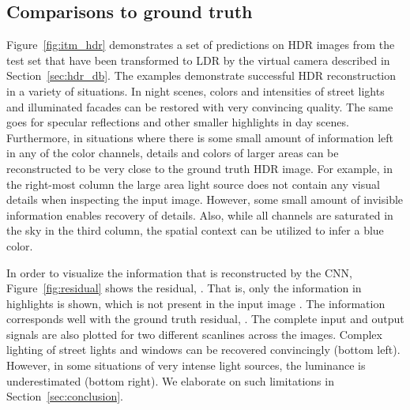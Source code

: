 \documentclass[acmtog]{acmart}
\newcommand{\figref}[1]{Figure~\ref{fig:#1}}
\newcommand{\secref}[1]{Section~\ref{sec:#1}}
\newcommand\customsection[1]{\subsection{#1}}
\begin{document}
\customsection{Comparisons to ground truth}
\figref{itm_hdr} demonstrates a set of predictions on HDR images from the test set that have been transformed to LDR by the virtual camera described in \secref{hdr_db}. The examples demonstrate successful HDR reconstruction in a variety of situations.
In night scenes, colors and intensities of street lights and illuminated facades can be restored with very convincing quality. The same goes for specular reflections and other smaller highlights in day scenes. Furthermore, in situations where there is some small amount of information left in any of the color channels, details and colors of larger areas can be reconstructed to be very close to the ground truth HDR image. For example, in the right-most column the large area light source does not contain any visual details when inspecting the input image. However, some small amount of invisible information enables recovery of details. Also, while all channels are saturated in the sky in the third column, the spatial context can be utilized to infer a blue color.

In order to visualize the information that is reconstructed by the CNN, \figref{residual} shows the residual, . That is, only the information in highlights is shown, which is not present in the input image . The information corresponds well with the ground truth residual, . The complete input and output signals are also plotted for two different scanlines across the images. Complex lighting of street lights and windows can be recovered convincingly (bottom left). However, in some situations of very intense light sources, the luminance is underestimated (bottom right). We elaborate on such limitations in \secref{conclusion}.
\end{document}
